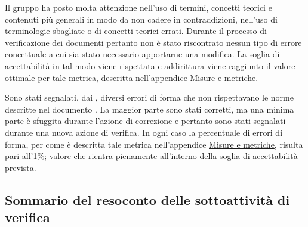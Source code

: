 \documentclass[a4paper, titlepage]{article}
\begin{document}
Il gruppo ha posto molta attenzione nell'uso di termini, concetti teorici e contenuti più generali in modo da non cadere in contraddizioni, nell'uso di terminologie sbagliate o di concetti teorici errati. Durante il processo di verificazione dei documenti pertanto non è stato riscontrato nessun tipo di errore concettuale a cui sia stato necessario apportarne una modifica. 
\newline La soglia di accettabilità in tal modo viene rispettata e addirittura viene raggiunto il valore ottimale per tale metrica, descritta nell'appendice \hyperref[sec:metr]{Misure e metriche}.

Sono stati segnalati, dai , diversi errori di forma che non rispettavano le norme descritte nel documento . La maggior parte sono stati corretti, ma una minima parte è sfuggita durante l'azione di correzione e pertanto sono stati segnalati durante una nuova azione di verifica.
\newline In ogni caso la percentuale di errori di forma, per come è descritta tale metrica nell'appendice \hyperref[sec:metr]{Misure e metriche}, risulta pari all'1\%; valore che rientra pienamente all'interno della soglia di accettabilità prevista.


\subsection {Sommario del resoconto delle sottoattività di verifica}
\end{document}
